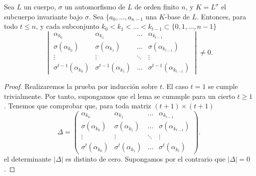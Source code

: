 \begin{lemma}
    Sea \(L\) un cuerpo, \(\sigma\) un automorfismo de \(L\) de orden finito \(n\), y \(K = L^\sigma\) el subcuerpo invariante bajo \(\sigma\). Sea  \(\{a_0, \dots, a_{n-1}\) una \(K\)-base de \(L\). Entonces, para todo \(t \leq n\), y cada subconjunto \(k_0 < k_1 < \dots < k_{t-1} \subset \{0, 1, \dots, n-1\}\)
    \[
    \begin{vmatrix}
        \alpha_{k_0} & \alpha_{k_1} & \dots & \alpha_{k_{t -1}} \\
        \sigma(\alpha_{k_0}) & \sigma(\alpha_{k_1}) & \dots & \sigma(\alpha_{k_{t-1}}) \\
        \vdots & \vdots & \ddots & \vdots \\
        \sigma^{t-1}(\alpha_{k_0}) & \sigma^{t-1}(\alpha_{k_1}) & \dots & \sigma^{t-1}(\alpha_{k_{t-1}})
    \end{vmatrix}
    \neq 0
    .\]
\end{lemma}

\begin{proof}
    Realizaremos la prueba por inducción sobre \(t\). El caso \(t = 1\) se cumple trivialmente. Por tanto, supongamos que el lema se cummple para un cierto  \(t \geq 1\). Tenemos que comprobar que, para toda matriz \((t+1) \times (t+1)\)
    \[
    \Delta =
    \begin{pmatrix}
        \alpha_{k_0} & \alpha_{k_1} & \dots & \alpha_{k_{t -1}} \\
        \sigma(\alpha_{k_0}) & \sigma(\alpha_{k_1}) & \dots & \sigma(\alpha_{k_{t-1}}) \\
        \vdots & \vdots & \ddots & \vdots \\
        \sigma^{t}(\alpha_{k_0}) & \sigma^{t}(\alpha_{k_1}) & \dots & \sigma^{t}(\alpha_{k_{t}})

    \end{pmatrix}
    .\]
el determinante \(|\Delta|\) es distinto de cero. Supongamos por el contrario que \(|\Delta| = 0\).
\end{proof}
